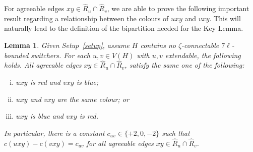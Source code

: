 \documentclass[A4paper,12pt]{article}
\newtheorem{lem}[thm]{Lemma}
\theoremstyle{definition}
\begin{document}
\bigskip

For agreeable edges $xy \in \hat{R}_u \cap \hat{R}_v$, we are able to prove the following important result regarding a relationship between the colours of $uxy$ and $vxy$. This will naturally lead to the definition of the bipartition needed for the Key Lemma.

\begin{lem}\label{lem:c_uv}
Given Setup~\ref{setup}, assume $H$ contains no $\zeta$-connectable $7\ell$-bounded switchers. For each $u,v \in V(H)$ with $u,v$ extendable, the following holds. All agreeable edges $xy\in \hat{R}_u \cap \hat{R}_v$, satisfy the same one of the following: 
\begin{enumerate}[(i)]
\item $uxy$ is red and $vxy$ is blue;
\item $uxy$ and $vxy$ are the same colour; or
\item $uxy$ is blue and $vxy$ is red.
\end{enumerate}
 In particular, there is a constant $c_{uv} \in \{+2,0,-2\}$ such that  $c(uxy) - c(vxy) = c_{uv}$ for all agreeable edges $xy\in\hat{R}_u \cap \hat{R}_v$.
\end{lem}
\end{document}
